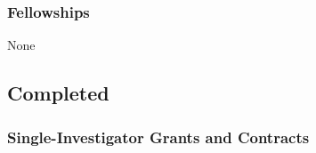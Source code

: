 \documentclass[10pt]{article}
\begin{document}
%

%
%
%

\subsubsection*{Fellowships}

None

\eject

\subsection*{Completed}

\subsubsection*{Single-Investigator Grants and Contracts}
\end{document}
